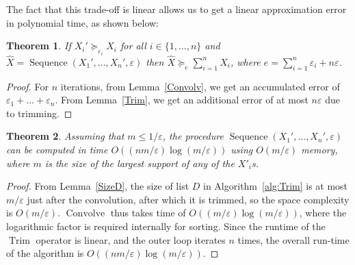 \documentclass[review]{elsarticle}
\newtheorem{theorem}{Theorem}
\DeclareMathOperator{\Trim}{Trim}
\DeclareMathOperator{\Sequence}{Sequence}
\begin{document}
The fact that this trade-off is linear allows us to get a linear approximation error 
in polynomial time, as shown below:



\begin{theorem}
If $X_i' \succeq_{\varepsilon_i} X_i$ for all $i \in\{1,\dots,n\}$ and $\hat{X}= \Sequence(X_1',\dots,X_n', \varepsilon)$ then
$\hat{X} \succeq_e \sum_{i=1}^{n} X_{i}$, where $e={\sum_{i=1}^n\varepsilon_i + n \varepsilon}$. 
\label{appSeqTheorem}
\end{theorem} 

\begin{proof} For $n$ iterations, from Lemma~\ref{Convolv}, we get an accumulated error of 
$\varepsilon_1 +\dots+ \varepsilon_n$. From Lemma~\ref{Trim}, we get an additional error of at most $n\varepsilon$ due to trimming. 
\end{proof}


\begin{theorem} \label{appSeqComplexTheorem}
Assuming that $m \leq 1/\varepsilon$, the procedure
$\Sequence(X_1',\dots,X_n', \varepsilon)$ can be computed
in time $O((nm/\varepsilon)\log(m/\varepsilon))$ using $O(m/\varepsilon)$ memory, where $m$ is the size of the largest support of any of the $X'_i$s.
\end{theorem} 

\begin{proof}
From Lemma~\ref{SizeD}, the size of list $D$ in 
Algorithm~\ref{alg:Trim} is at most $m/\varepsilon$
just after the convolution, after which it is trimmed, so the space complexity 
is $O(m/\varepsilon)$.
$\operatorname{Convolve}$ thus takes time of $O((m/\varepsilon)\log(m/\varepsilon))$, where the logarithmic factor
is required internally
for sorting. Since the runtime of  the $\Trim$ operator is linear, and the
outer loop iterates $n$ times, the overall 
run-time of the algorithm is $O((n m/\varepsilon) \log(m/\varepsilon))$.
\end{proof}
\end{document}

